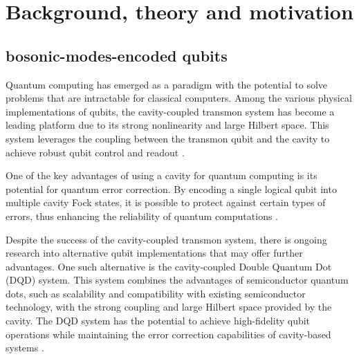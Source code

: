 \documentclass[12pt]{article}
\begin{document}
\section{Background, theory and motivation}




\subsection{bosonic-modes-encoded qubits}
Quantum computing has emerged as a paradigm with the potential to solve problems that are intractable for classical computers. Among the various physical implementations of qubits, the cavity-coupled transmon system has become a leading platform due to its strong nonlinearity and large Hilbert space. This system leverages the coupling between the transmon qubit and the cavity to achieve robust qubit control and readout \cite{blais2004, houck2008}.

One of the key advantages of using a cavity for quantum computing is its potential for quantum error correction. By encoding a single logical qubit into multiple cavity Fock states, it is possible to protect against certain types of errors, thus enhancing the reliability of quantum computations \cite{girvin2014, ofek2016}.

Despite the success of the cavity-coupled transmon system, there is ongoing research into alternative qubit implementations that may offer further advantages. One such alternative is the cavity-coupled Double Quantum Dot (DQD) system. This system combines the advantages of semiconductor quantum dots, such as scalability and compatibility with existing semiconductor technology, with the strong coupling and large Hilbert space provided by the cavity. The DQD system has the potential to achieve high-fidelity qubit operations while maintaining the error correction capabilities of cavity-based systems \cite{Mi2018}.
\end{document}

